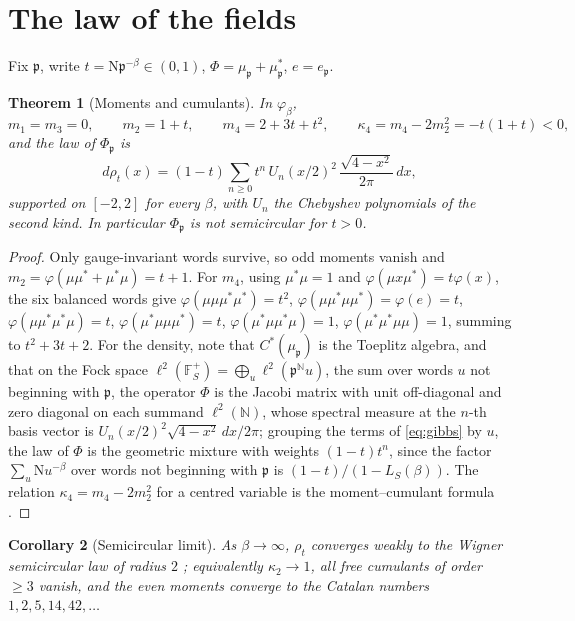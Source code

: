 \documentclass[11pt]{amsart}
\numberwithin{equation}{section}
\newtheorem{theorem}{Theorem}[section]
\newtheorem{corollary}[theorem]{Corollary}
\theoremstyle{definition}
\theoremstyle{remark}
\newcommand{\N}{\mathbb{N}}
\newcommand{\F}{\mathbb{F}}
\newcommand{\pp}{\mathfrak{p}}
\newcommand{\Ns}{\mathrm{N}}
\begin{document}
\section{The law of the fields}

Fix $\pp$, write $t=\Ns\pp^{-\beta}\in(0,1)$, $\Phi=\mu_\pp+\mu_\pp^*$, $e=e_\pp$.

\begin{theorem}[Moments and cumulants]\label{thm:moments}
In $\varphi_\beta$,
\[
m_1=m_3=0,\qquad m_2=1+t,\qquad m_4=2+3t+t^2,\qquad \kappa_4=m_4-2m_2^2=-t(1+t)<0 ,
\]
and the law of $\Phi_\pp$ is
\[
d\rho_t(x)=(1-t)\sum_{n\ge0}t^n\,U_n(x/2)^2\,\frac{\sqrt{4-x^2}}{2\pi}\,dx ,
\]
supported on $[-2,2]$ for every $\beta$, with $U_n$ the Chebyshev polynomials of the second
kind. In particular $\Phi_\pp$ is not semicircular for $t>0$.
\end{theorem}

\begin{proof}
Only gauge-invariant words survive, so odd moments vanish and
$m_2=\varphi(\mu\mu^*+\mu^*\mu)=t+1$. For $m_4$, using $\mu^*\mu=1$ and
$\varphi(\mu x\mu^*)=t\varphi(x)$, the six balanced words give
$\varphi(\mu\mu\mu^*\mu^*)=t^2$, $\varphi(\mu\mu^*\mu\mu^*)=\varphi(e)=t$,
$\varphi(\mu\mu^*\mu^*\mu)=t$, $\varphi(\mu^*\mu\mu\mu^*)=t$,
$\varphi(\mu^*\mu\mu^*\mu)=1$, $\varphi(\mu^*\mu^*\mu\mu)=1$, summing to $t^2+3t+2$. For the
density, note that $C^*(\mu_\pp)$ is the Toeplitz algebra, and that on the Fock space
$\ell^2(\F_S^+)=\bigoplus_{u}\ell^2(\pp^{\N}u)$, the sum over words $u$ not beginning with
$\pp$, the operator $\Phi$ is the Jacobi matrix with unit off-diagonal and zero diagonal on
each summand $\ell^2(\N)$, whose spectral measure at the $n$-th basis vector is
$U_n(x/2)^2\sqrt{4-x^2}\,dx/2\pi$; grouping the terms of \eqref{eq:gibbs} by $u$, the law of
$\Phi$ is the geometric mixture with weights $(1-t)t^n$, since the factor
$\sum_u\Ns u^{-\beta}$ over words not beginning with $\pp$ is $(1-t)/(1-L_S(\beta))$. The
relation $\kappa_4=m_4-2m_2^2$ for a centred variable is the moment--cumulant formula
\cite{NS}.
\end{proof}

\begin{corollary}[Semicircular limit]\label{cor:semicircle}
As $\beta\to\infty$, $\rho_t$ converges weakly to the Wigner semicircular law of radius $2$
\cite{VDN};
equivalently $\kappa_2\to1$, all free cumulants of order $\ge3$ vanish, and the even moments
converge to the Catalan numbers $1,2,5,14,42,\dots$
\end{corollary}
\end{document}
